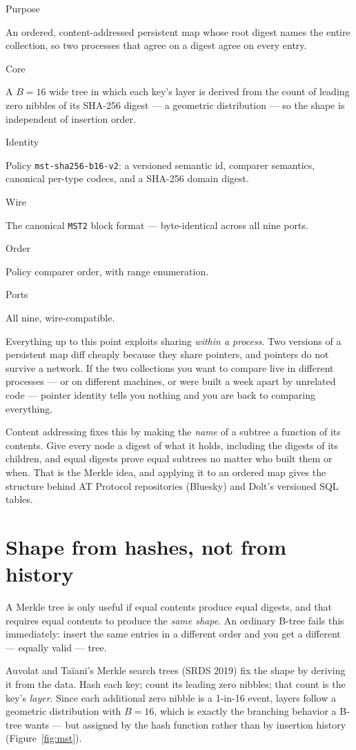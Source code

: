 \documentclass[11pt,twoside,openright]{book}
\newcommand{\code}[1]{\texorpdfstring{\textcolor{d7ink}{\texttt{#1}}}{#1}}
\newcommand{\term}[1]{\textit{#1}}
\newcommand{\spec}[2]{%
  \par\noindent
  \parbox[t]{0.21\linewidth}{\raggedright\sffamily\bfseries\footnotesize
    \color{d7slate}\strut #1}%
  \hspace{9pt}%
  \parbox[t]{\dimexpr0.79\linewidth-9pt\relax}{\raggedright\strut #2}%
  \par\vspace{3.5pt}}
\newenvironment{specimen}[1][Specimen]
  {\begin{glancebox}[#1]\small\setlength{\parindent}{0pt}}
  {\end{glancebox}}
\begin{document}
\begin{specimen}[Specimen --- \code{MerkleSearchTree}]
%
\spec{Purpose}{An ordered, content-addressed persistent map whose root digest names the entire collection, so two processes that agree on a digest agree on every entry.}
\spec{Core}{A $B=16$ wide tree in which each key's layer is derived from the count of leading zero nibbles of its SHA-256 digest --- a geometric distribution --- so the shape is independent of insertion order.}
\spec{Identity}{Policy \code{mst-sha256-b16-v2}: a versioned semantic id, comparer semantics, canonical per-type codecs, and a SHA-256 domain digest.}
\spec{Wire}{The canonical \code{MST2} block format --- byte-identical across all nine ports.}
\spec{Order}{Policy comparer order, with range enumeration.}
\spec{Ports}{All nine, wire-compatible.}
\end{specimen}

\noindent
Everything up to this point exploits sharing \emph{within a process}. Two
versions of a persistent map diff cheaply because they share pointers, and
pointers do not survive a network. If the two collections you want to compare
live in different processes --- or on different machines, or were built a week
apart by unrelated code --- pointer identity tells you nothing and you are back
to comparing everything.

Content addressing fixes this by making the \emph{name} of a subtree a function
of its contents. Give every node a digest of what it holds, including the digests
of its children, and equal digests prove equal subtrees no matter who built them
or when. That is the Merkle idea, and applying it to an ordered map gives
the structure behind AT Protocol repositories (Bluesky) and Dolt's versioned SQL
tables.

\section{Shape from hashes, not from history}

A Merkle tree is only useful if equal contents produce equal digests, and that
requires equal contents to produce the \emph{same shape}. An ordinary B-tree
fails this immediately: insert the same entries in a different order and you get
a different --- equally valid --- tree.

Auvolat and Taïani's Merkle search trees (SRDS 2019) fix the shape by deriving
it from the data. Hash each key; count its leading zero nibbles; that count is
the key's \term{layer}. Since each additional zero nibble is a 1-in-16 event,
layers follow a geometric distribution with $B = 16$, which is exactly the
branching behavior a B-tree wants --- but assigned by the hash function rather
than by insertion history (Figure~\ref{fig:mst}).
\end{document}
